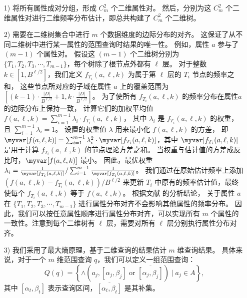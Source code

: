 \begin{enumerate}
\item [1)]  \myahead 将所有属性成对分组，形成 $C_m^2$ 个二维属性对。
然后，\myahead 分别为这 $C_m^2$ 个二维属性对进行二维频率分布估计，即总共构建了 $C_m^2$ 个二维树。
\item [2)]  
\myahead 需要在二维树集合中进行 $m$ 个数据维度的边际分布的对齐。
这保证了从不同二维树中进行某一属性的范围查询时结果的唯一性。
例如，属性 $a$ 参与了 $(m-1)$ 个属性对。
假设这 $(m-1)$ 个二维树分别为 $\{T_1, T_2, T_3, \cdots, T_{m-1}\}$，每个树除了根节点外都有 $\ell$ 层。
对于整数 $k \in [1, B^{\ell/2}]$，我们定义 $f_{T_i}(a, \ell, k)$ 为属于第 $\ell$ 层的 $T_i$ 节点的频率之和，
这些节点所对应的子域在属性 $a$ 上的覆盖范围为 $[(k-1)\cdot\frac{|D|}{B^{\ell/2}}+1, k\cdot\frac{|D|}{B^{\ell/2}}]$。
为了使所有 $f_{T_i}(a, \ell, k)$ 的频率分布在属性$a$的边际分布上保持一致，
\myahead 计算它们的加权平均值 $f(a, \ell, k) = \sum_{i=1}^{m-1}\lambda_{i} \cdot f_{T_i}(a, \ell, k)$，
其中 $\lambda_i$ 是 $f_{T_i}(a, \ell, k)$ 的权重，且 $\sum_{i=1}^{m-1}\lambda_i = 1$。
设置的权重值 $\lambda$ 用来最小化 $f(a, \ell, k)$ 的方差，
即 $\myvar[f(a, \ell, k)] = \sum_{i=1}^{m-1}\lambda_i^2\cdot \myvar[f_{T_i}(a, \ell, k)]$，其中 $\myvar[f_{T_i}(a, \ell, k)]$ 是用于计算 $f_{T_i}(a, \ell, k)$ 的节点理论方差之和。
当权重与估计值的方差成反比时，$\myvar[f(a, \ell, k)]$ 最小\cite{yang2020answering}。
因此，最优权重 $\lambda_i = \frac{1}{\myvar[f_{T_i}(a, \ell, k)]}/\sum_{i=1}^{m-1}\frac{1}{\myvar[f_{T_i}(a, \ell, k)]}$。
我们通过在原始估计频率上添加 $(f(a, \ell, k) - f_{T_i}(a, \ell, k))/B^{\ell/2}$ 来更新 $T_i$ 中原有的频率估计值，最终使每个 $f_{T_i}(a, \ell, k)$ 等于 $f(a, \ell, k)$。
根据文献{\rm\parencite{qardaji2014priview}} 的分析结论，
关于属性 $a$ 在 $\{T_1, T_2, T_3, \cdots, T_{m-1}\}$ 进行属性分布对齐不会影响其他属性的频率分布。
因此，我们可以按任意属性顺序进行属性分布对齐，\myahead 可以实现所有 $m$ 个属性的一致性。注意到每个二维树有 $\ell$ 层，\myahead 需要对所有 $\ell$ 层分别执行属性分布对齐。
\item [3)]  
我们采用了最大熵原理\cite{qardaji2014priview}，基于二维查询的结果估计 $m$ 维查询结果。
具体来说，对于一个 $m$ 维范围查询 $q$，我们可以定义一组范围查询：
$$Q(q)=\left\{\wedge\left(a_{j},\left[\alpha_{j}, \beta_{j}\right] \text { or }\overline{\left[\alpha_{j}, \beta_{j}\right]}\right) \mid a_{j} \in A\right\}\text{,}$$
其中 $[\alpha_t, \beta_t]$ 表示查询区间，$\overline{\left[\alpha_{t}, \beta_{t}\right]}$ 是其补集。

\end{enumerate}
